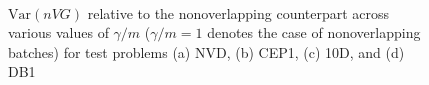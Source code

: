 \documentclass[12pt]{article}
\newcommand{\var}[1]{\mathrm{Var} \left( #1 \right)}
\begin{document}
\begin{figure}[htb!]
	\centering
	\\
	\caption{
		$\var{n VG}$ relative to the nonoverlapping counterpart across various values of $\gamma/m$ ($\gamma/m=1$ denotes the case of nonoverlapping batches) for test problems
		(a) NVD,
		(b) CEP1,
		(c) 10D, and
		(d) DB1
	}
\label{fig:varvar1}
\end{figure}
\end{document}
